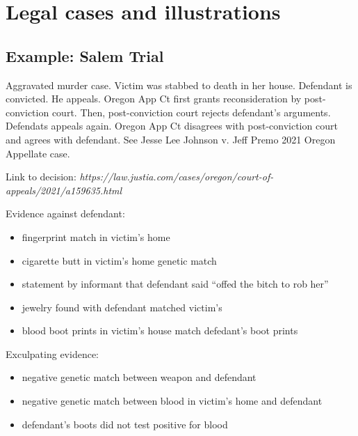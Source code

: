 \documentclass[
  10pt,
  dvipsnames,enabledeprecatedfontcommands]{scrartcl}
\begin{document}
\hypertarget{legal-cases-and-illustrations}{%
\section{Legal cases and
illustrations}\label{legal-cases-and-illustrations}}

\hypertarget{example-salem-trial}{%
\subsection{Example: Salem Trial}\label{example-salem-trial}}


Aggravated murder case. Victim was stabbed to death in her house.
Defendant is convicted. He appeals. Oregon App Ct first grants
reconsideration by post-conviction court. Then, post-conviction court
rejects defendant's arguments. Defendats appeals again. Oregon App Ct
disagrees with post-conviction court and agrees with defendant. See
Jesse Lee Johnson v. Jeff Premo 2021 Oregon Appellate case.

Link to decision:
\textit{https://law.justia.com/cases/oregon/court-of-appeals/2021/a159635.html}

Evidence against defendant:

\begin{itemize}
\item
  fingerprint match in victim's home
\item
  cigarette butt in victim's home genetic match
\item
  statement by informant that defendant said ``offed the bitch to rob
  her''
\item
  jewelry found with defendant matched victim's
\item
  blood boot prints in victim's house match defedant's boot prints
\end{itemize}

Exculpating evidence:

\begin{itemize}
\item
  negative genetic match between weapon and defendant
\item
  negative genetic match between blood in victim's home and defendant
\item
  defendant's boots did not test positive for blood
\end{itemize}
\end{document}
